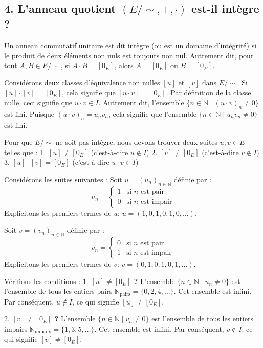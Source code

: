 \documentclass{report}
\begin{document}
\subsection*{4. L'anneau quotient $(E/\sim, +, \cdot)$ est-il intègre ?}

Un anneau commutatif unitaire est dit intègre (ou est un domaine d'intégrité) si le produit de deux éléments non nuls est toujours non nul. Autrement dit, pour tout $A, B \in E/\sim$, si $A \cdot B = [0_E]$, alors $A = [0_E]$ ou $B = [0_E]$.

Considérons deux classes d'équivalence non nulles $[u]$ et $[v]$ dans $E/\sim$.
Si $[u] \cdot [v] = [0_E]$, cela signifie que $[u \cdot v] = [0_E]$.
Par définition de la classe nulle, ceci signifie que $u \cdot v \in I$.
Autrement dit, l'ensemble $\{ n \in \mathbb{N} \mid (u \cdot v)_n \neq 0 \}$ est fini.
Puisque $(u \cdot v)_n = u_n v_n$, cela signifie que l'ensemble $\{ n \in \mathbb{N} \mid u_n v_n \neq 0 \}$ est fini.

Pour que $E/\sim$ ne soit pas intègre, nous devons trouver deux suites $u, v \in E$ telles que :
1.  $[u] \neq [0_E]$ (c'est-à-dire $u \notin I$)
2.  $[v] \neq [0_E]$ (c'est-à-dire $v \notin I$)
3.  $[u] \cdot [v] = [0_E]$ (c'est-à-dire $u \cdot v \in I$)

Considérons les suites suivantes :
Soit $u = (u_n)_{n \in \mathbb{N}}$ définie par :
$$ u_n = \begin{cases} 1 & \text{si } n \text{ est pair} \\ 0 & \text{si } n \text{ est impair} \end{cases} $$
Explicitons les premiers termes de $u$: $u = (1, 0, 1, 0, 1, 0, \dots)$.

Soit $v = (v_n)_{n \in \mathbb{N}}$ définie par :
$$ v_n = \begin{cases} 0 & \text{si } n \text{ est pair} \\ 1 & \text{si } n \text{ est impair} \end{cases} $$
Explicitons les premiers termes de $v$: $v = (0, 1, 0, 1, 0, 1, \dots)$.

Vérifions les conditions :
1.  \textbf{$[u] \neq [0_E]$ ?}
    L'ensemble $\{ n \in \mathbb{N} \mid u_n \neq 0 \}$ est l'ensemble de tous les entiers pairs $\mathbb{N}_{\text{pairs}} = \{0, 2, 4, \dots \}$.
    Cet ensemble est infini.
    Par conséquent, $u \notin I$, ce qui signifie $[u] \neq [0_E]$.

2.  \textbf{$[v] \neq [0_E]$ ?}
    L'ensemble $\{ n \in \mathbb{N} \mid v_n \neq 0 \}$ est l'ensemble de tous les entiers impairs $\mathbb{N}_{\text{impairs}} = \{1, 3, 5, \dots \}$.
    Cet ensemble est infini.
    Par conséquent, $v \notin I$, ce qui signifie $[v] \neq [0_E]$.
\end{document}
